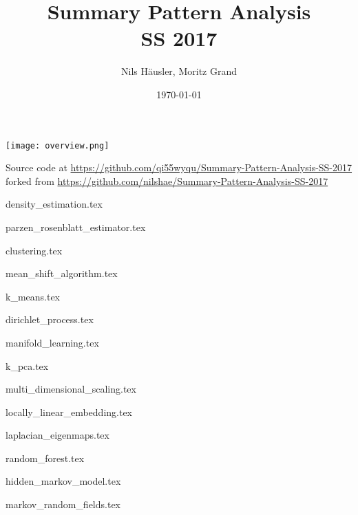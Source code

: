 \documentclass[a4paper]{article}
\title{Summary Pattern Analysis\\ SS 2017}
\author{Nils Häusler, Moritz Grand}
\date{\today}
\begin{document}
\begin{titlepage}
  \thispagestyle{empty}
  \maketitle
  \texttt{[image: overview.png]}
\end{titlepage}

{
{\centering
  Source code at
  \url{https://github.com/qi55wyqu/Summary-Pattern-Analysis-SS-2017} forked from
  \url{https://github.com/nilshae/Summary-Pattern-Analysis-SS-2017}\par
}
\vspace{5mm}

\begin{multicols}{2}
\tableofcontents
\listoffigures
\listofalgorithms
\end{multicols}
}

\newpage
{density_estimation.tex}

{parzen_rosenblatt_estimator.tex}

{clustering.tex}

{mean_shift_algorithm.tex}

{k_means.tex}

{dirichlet_process.tex}

{manifold_learning.tex}

{k_pca.tex}

{multi_dimensional_scaling.tex}

{locally_linear_embedding.tex}

{laplacian_eigenmaps.tex}

{random_forest.tex}

{hidden_markov_model.tex}

{markov_random_fields.tex}

\nocite{*}


\end{document}
